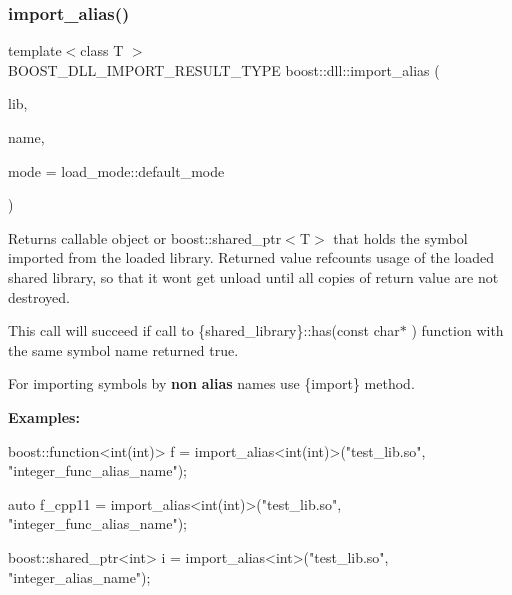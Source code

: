 \subsubsection{\texorpdfstring{import\+\_\+alias()}{import\_alias()}\hspace{0.1cm}{\footnotesize\ttfamily [1/6]}}
{\footnotesize\ttfamily template$<$class T $>$ \\
B\+O\+O\+S\+T\+\_\+\+D\+L\+L\+\_\+\+I\+M\+P\+O\+R\+T\+\_\+\+R\+E\+S\+U\+L\+T\+\_\+\+T\+Y\+PE boost\+::dll\+::import\+\_\+alias (\begin{DoxyParamCaption}\item[{const boost\+::filesystem\+::path \&}]{lib,  }\item[{const char $\ast$}]{name,  }\item[{\hyperlink{a00272_a1918a602801479bc0bade54ff5665129}{load\+\_\+mode\+::type}}]{mode = {\ttfamily load\+\_\+mode\+:\+:default\+\_\+mode} }\end{DoxyParamCaption})}

Returns callable object or boost\+::shared\+\_\+ptr$<$\+T$>$ that holds the symbol imported from the loaded library. Returned value refcounts usage of the loaded shared library, so that it won\textquotesingle{}t get unload until all copies of return value are not destroyed.

This call will succeed if call to \{shared\+\_\+library\}{\ttfamily \+::has(const char$\ast$ )} function with the same symbol name returned {\ttfamily true}.

For importing symbols by {\bfseries non} {\bfseries alias} names use \{import\} method.

{\bfseries Examples\+:} 


\begin{DoxyCode}
boost::function<int(int)> f = import\_alias<int(int)>(\textcolor{stringliteral}{"test\_lib.so"}, \textcolor{stringliteral}{"integer\_func\_alias\_name"});

\textcolor{keyword}{auto} f\_cpp11 = import\_alias<int(int)>(\textcolor{stringliteral}{"test\_lib.so"}, \textcolor{stringliteral}{"integer\_func\_alias\_name"});
\end{DoxyCode}



\begin{DoxyCode}
boost::shared\_ptr<int> i = import\_alias<int>(\textcolor{stringliteral}{"test\_lib.so"}, \textcolor{stringliteral}{"integer\_alias\_name"});
\end{DoxyCode}



